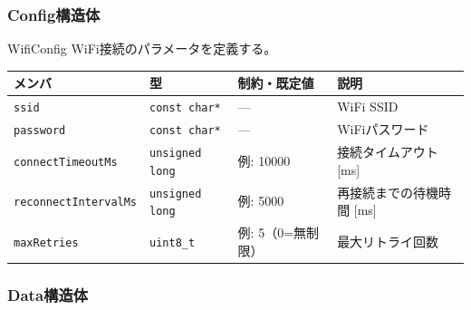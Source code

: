 \subsubsection{Config構造体}

\begin{funcblock}{WifiConfig}
WiFi接続のパラメータを定義する。

\begin{longtable}{l l l p{4.0cm}}
\toprule
\textbf{メンバ} & \textbf{型} & \textbf{制約・既定値} & \textbf{説明} \\
\midrule
\endhead
\texttt{ssid}                & \texttt{const char*}   & ---          & WiFi SSID \\
\texttt{password}            & \texttt{const char*}   & ---          & WiFiパスワード \\
\texttt{connectTimeoutMs}    & \texttt{unsigned long} & 例: 10000    & 接続タイムアウト [ms] \\
\texttt{reconnectIntervalMs} & \texttt{unsigned long} & 例: 5000     & 再接続までの待機時間 [ms] \\
\texttt{maxRetries}          & \texttt{uint8\_t}      & 例: 5（0=無制限）& 最大リトライ回数 \\
\bottomrule
\end{longtable}
\end{funcblock}

\subsubsection{Data構造体}

